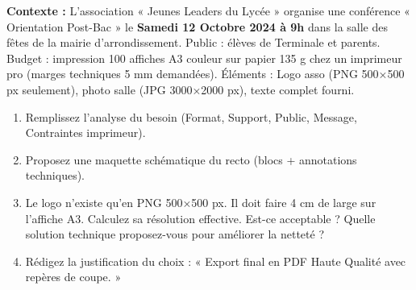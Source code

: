\documentclass[11pt]{article}
\begin{document}
\begin{exercice}
\textbf{Contexte :} L'association « Jeunes Leaders du Lycée » organise une conférence « Orientation Post-Bac » le \textbf{Samedi 12 Octobre 2024 à 9h} dans la salle des fêtes de la mairie d'arrondissement. Public : élèves de Terminale et parents. Budget : impression 100 affiches A3 couleur sur papier 135 g chez un imprimeur pro (marges techniques 5 mm demandées). Éléments : Logo asso (PNG 500×500 px seulement), photo salle (JPG 3000×2000 px), texte complet fourni.

\begin{enumerate}
    \item Remplissez l'analyse du besoin (Format, Support, Public, Message, Contraintes imprimeur).
    \item Proposez une maquette schématique du recto (blocs + annotations techniques).
    \item Le logo n'existe qu'en PNG 500×500 px. Il doit faire 4 cm de large sur l'affiche A3. Calculez sa résolution effective. Est-ce acceptable ? Quelle solution technique proposez-vous pour améliorer la netteté ?
    \item Rédigez la justification du choix : « Export final en PDF Haute Qualité avec repères de coupe. »
\end{enumerate}
\end{exercice}
\end{document}
